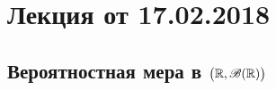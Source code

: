 \section{Лекция от 17.02.2018}
\subsection*{Вероятностная мера в $\big( \mathbb{R}, \mathscr{B}(\mathbb{R}) \big)$}
\begin{definition}
	
\end{definition}